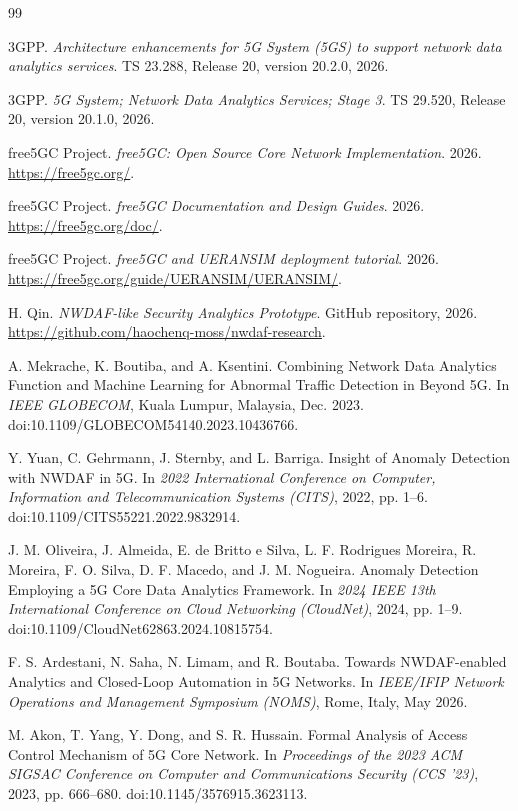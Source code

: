 \documentclass[sigconf,review]{acmart}
\begin{document}
\balance
\begin{thebibliography}{99}
\small

3GPP. \emph{Architecture enhancements for 5G System (5GS) to support network data analytics services}. TS 23.288, Release 20, version 20.2.0, 2026.

3GPP. \emph{5G System; Network Data Analytics Services; Stage 3}. TS 29.520, Release 20, version 20.1.0, 2026.

free5GC Project. \emph{free5GC: Open Source Core Network Implementation}. 2026. \url{https://free5gc.org/}.

free5GC Project. \emph{free5GC Documentation and Design Guides}. 2026. \url{https://free5gc.org/doc/}.

free5GC Project. \emph{free5GC and UERANSIM deployment tutorial}. 2026. \url{https://free5gc.org/guide/UERANSIM/UERANSIM/}.

H. Qin. \emph{NWDAF-like Security Analytics Prototype}. GitHub repository, 2026. \url{https://github.com/haochenq-moss/nwdaf-research}.

A. Mekrache, K. Boutiba, and A. Ksentini. Combining Network Data Analytics Function and Machine Learning for Abnormal Traffic Detection in Beyond 5G. In \emph{IEEE GLOBECOM}, Kuala Lumpur, Malaysia, Dec. 2023. doi:10.1109/GLOBECOM54140.2023.10436766.

Y. Yuan, C. Gehrmann, J. Sternby, and L. Barriga. Insight of Anomaly Detection with NWDAF in 5G. In \emph{2022 International Conference on Computer, Information and Telecommunication Systems (CITS)}, 2022, pp. 1--6. doi:10.1109/CITS55221.2022.9832914.

J. M. Oliveira, J. Almeida, E. de Britto e Silva, L. F. Rodrigues Moreira, R. Moreira, F. O. Silva, D. F. Macedo, and J. M. Nogueira. Anomaly Detection Employing a 5G Core Data Analytics Framework. In \emph{2024 IEEE 13th International Conference on Cloud Networking (CloudNet)}, 2024, pp. 1--9. doi:10.1109/CloudNet62863.2024.10815754.

F. S. Ardestani, N. Saha, N. Limam, and R. Boutaba. Towards NWDAF-enabled Analytics and Closed-Loop Automation in 5G Networks. In \emph{IEEE/IFIP Network Operations and Management Symposium (NOMS)}, Rome, Italy, May 2026.

M. Akon, T. Yang, Y. Dong, and S. R. Hussain. Formal Analysis of Access Control Mechanism of 5G Core Network. In \emph{Proceedings of the 2023 ACM SIGSAC Conference on Computer and Communications Security (CCS '23)}, 2023, pp. 666--680. doi:10.1145/3576915.3623113.


\end{thebibliography}
\end{document}
